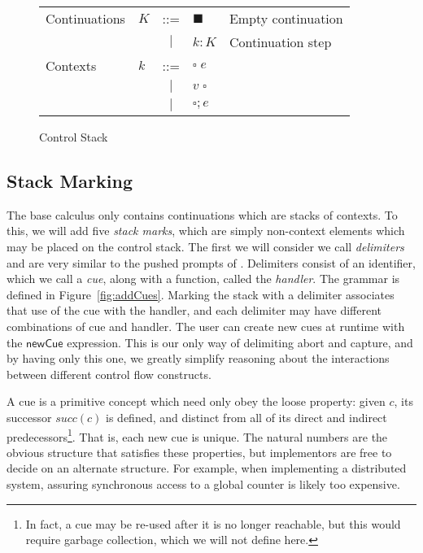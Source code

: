 \documentclass[11pt]{article}
\newcommand{\newhandler}{\textsf{newCue}}
\begin{document}
\begin{figure}[h!]
\caption{Control Stack}
\label{fig:controlStack}
\begin{tabular}{llcll}
Continuations & $K$ & ::= & $\blacksquare$ & Empty continuation \\
& & $|$ & $k:K$ & Continuation step \\
Contexts & $k$ & ::= & $\square\;e$\\
& & $|$ & $v\;\square$ \\
& & $|$ & $\square;e$ \\
\end{tabular}
\end{figure}

\subsection{Stack Marking}

The base calculus only contains continuations which are stacks of contexts.
To this, we will add five \emph{stack marks}, which are simply non-context elements which may be placed on the control stack.
The first we will consider we call \emph{delimiters} and are very similar to the pushed prompts of \cite{MFDC}.
Delimiters consist of an identifier, which we call a \emph{cue}, along with a function, called the \emph{handler}.
The grammar is defined in Figure~\ref{fig:addCues}.
Marking the stack with a delimiter associates that use of the cue with the handler, and each delimiter may have different combinations of cue and handler.
The user can create new cues at runtime with the $\newhandler$ expression.
This is our only way of delimiting abort and capture, and by having only this one, we greatly simplify reasoning about the interactions between different control flow constructs.

A cue is a primitive concept which need only obey the loose property:
given $c$, its successor $succ(c)$ is defined, and distinct from all of its direct and indirect predecessors\footnote{In fact, a cue may be re-used after it is no longer reachable, but this would require garbage collection, which we will not define here.}.
That is, each new cue is unique.
The natural numbers are the obvious structure that satisfies these properties, but implementors are free to decide on an alternate structure.
For example, when implementing a distributed system, assuring synchronous access to a global counter is likely too expensive.
\end{document}
